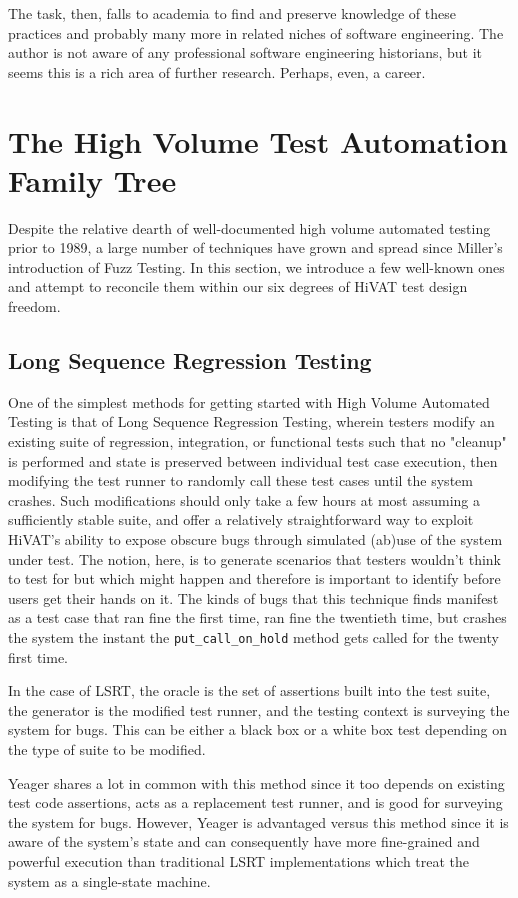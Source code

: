 The task, then, falls to academia to find and preserve knowledge of these practices and probably many more in related niches of software engineering. The author is not aware of any professional software engineering historians, but it seems this is a rich area of further research. Perhaps, even, a career.

\section{The High Volume Test Automation Family Tree}
Despite the relative dearth of well-documented high volume automated testing prior to 1989, a large number of techniques have grown and spread since Miller's introduction of Fuzz Testing. In this section, we introduce a few well-known ones and attempt to reconcile them within our six degrees of HiVAT test design freedom.

\subsection{Long Sequence Regression Testing}
One of the simplest methods for getting started with High Volume Automated Testing is that of Long Sequence Regression Testing, wherein testers modify an existing suite of regression, integration, or functional tests such that no "cleanup" is performed and state is preserved between individual test case execution, then modifying the test runner to randomly call these test cases until the system crashes. Such modifications should only take a few hours at most assuming a sufficiently stable suite, and offer a relatively straightforward way to exploit HiVAT's ability to expose obscure bugs through simulated (ab)use of the system under test. The notion, here, is to generate scenarios that testers wouldn't think to test for but which might happen and therefore is important to identify before users get their hands on it. The kinds of bugs that this technique finds manifest as a test case that ran fine the first time, ran fine the twentieth time, but crashes the system the instant the \texttt{put\_call\_on\_hold} method gets called for the twenty first time.

In the case of LSRT, the oracle is the set of assertions built into the test suite, the generator is the modified test runner, and the testing context is surveying the system for bugs. This can be either a black box or a white box test depending on the type of suite to be modified.

Yeager shares a lot in common with this method since it too depends on existing test code assertions, acts as a replacement test runner, and is good for surveying the system for bugs. However, Yeager is advantaged versus this method since it is aware of the system's state and can consequently have more fine-grained and powerful execution than traditional LSRT implementations which treat the system as a single-state machine.

